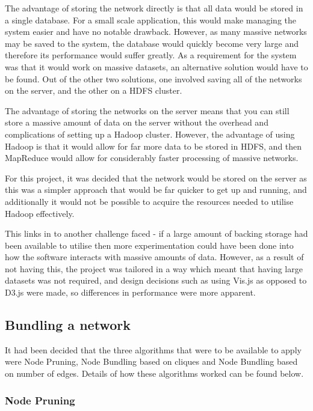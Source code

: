 \documentclass[../dissertation.tex]{subfiles}
\begin{document}
The advantage of storing the network directly is that all data would be stored in a single database. For a small scale application, this would make managing the system easier and have no notable drawback. However, as many massive networks may be saved to the system, the database would quickly become very large and therefore its performance would suffer greatly. As a requirement for the system was that it would work on massive datasets, an alternative solution would have to be found. Out of the other two solutions, one involved saving all of the networks on the server, and the other on a HDFS cluster. 

The advantage of storing the networks on the server means that you can still store a massive amount of data on the server without the overhead and complications of setting up a Hadoop cluster. However, the advantage of using Hadoop is that it would allow for far more data to be stored in HDFS, and then MapReduce would allow for considerably faster processing of massive networks.

For this project, it was decided that the network would be stored on the server as this was a simpler approach that would be far quicker to get up and running, and additionally it would not be possible to acquire the resources needed to utilise Hadoop effectively.

This links in to another challenge faced - if a large amount of backing storage had been available to utilise then more experimentation could have been done into how the software interacts with massive amounts of data. However, as a result of not having this, the project was tailored in a way which meant that having large datasets was not required, and design decisions such as using Vis.js as opposed to D3.js were made, so differences in performance were more apparent.

\subsection{Bundling a network}

It had been decided that the three algorithms that were to be available to apply were Node Pruning, Node Bundling based on cliques and Node Bundling based on number of edges. Details of how these algorithms worked can be found below.

\subsubsection{Node Pruning}
\label{sec:impl-node-prun}
\end{document}
